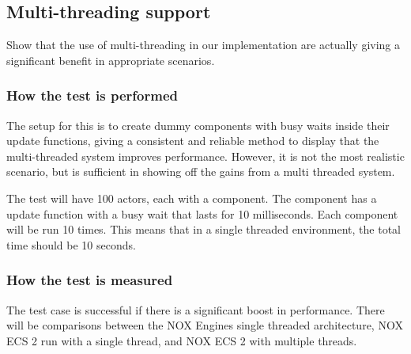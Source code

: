 \subsection{Multi-threading support}
Show that the use of multi-threading in our implementation are actually giving a significant benefit in appropriate scenarios.

\subsubsection*{How the test is performed}
The setup for this is to create dummy components with busy waits inside their update functions, giving a consistent and reliable method to display that the multi-threaded system improves performance.
 However, it is not the most realistic scenario, but is sufficient in showing off the gains from a multi threaded system.

The test will have 100 actors, each with a component.
The component has a update function with a busy wait that lasts for 10 milliseconds.
Each component will be run 10 times.
This means that in a single threaded environment, the total time should be 10 seconds.

\subsubsection*{How the test is measured}
The test case is successful if there is a significant boost in performance.
There will be comparisons between the NOX Engines single threaded architecture, NOX ECS 2 run with a single thread, and NOX ECS 2 with multiple threads.
